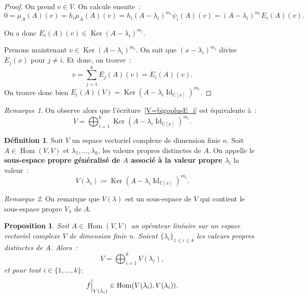 \documentclass{article}
\DeclareMathOperator{\Id}{Id}
\DeclareMathOperator{\Ker}{Ker}
\DeclareMathOperator{\Hom}{Hom}
\newcommand{\C}{\mathbb C}
\newcommand{\restr}[2]{ %
	\left.\kern-\nulldelimiterspace %
	#1 %
	\vphantom{\big|} %
	\right|_{#2} %
}
\newtheorem{prp}[thm]{Proposition}
\theoremstyle{definition}
\newtheorem{déf}[thm]{Définition}
\theoremstyle{remark}
\newtheorem*{rmq}{Remarque}
\begin{document}
		\begin{proof} On prend $v \in V$. On calcule ensuite~:
		\[0 = \mu_A(A)(v) = h_i\mu_A(A)(v) = h_i(A - \lambda_i)^{m_i}\psi_i(A)(v) = (A-\lambda_i)^{m_i}E_i(A)(v).\]

		On a donc $E_i(A)(v) \in \Ker(A - \lambda_i)^{m_i}$.

		Prenons maintenant $v \in \Ker(A - \lambda_i)^{m_i}$. On sait que $(x-\lambda_i)^{m_i}$ divise $E_j(x)$ pour $j \neq i$.
		Et donc, on trouve~: \[v = \sum_{j=1}^kE_j(A)(v) = E_i(A)(v).\]
		On trouve donc bien $E_i(A)(V) = \Ker(A-\lambda_i\Id_{\C[x]})^{m_i}$. \end{proof}

		\begin{rmq} On observe alors que l'écriture~\eqref{V=bigoplusE_i} est équivalente à~:
		\[V = \bigoplus_{i=1}^k\Ker(A - \lambda_i\Id_{\C[x]})^{m_i}.\]
		\end{rmq}

		\begin{déf} Soit $V$ un espace vectoriel complexe de dimension finie $n$. Soit $A \in \Hom(V, V)$ et $\lambda_1, \dotsc, \lambda_k$, les valeurs propres
		distinctes de $A$. On appelle le \textbf{sous-espace propre généralisé de $A$ associé à la valeur propre $\lambda_i$} la valeur~:
		\[V(\lambda_i) \coloneqq \Ker(A - \lambda_i \Id_{\C[x]})^{m_i}.\] \end{déf}

		\begin{rmq} On remarque que $V(\lambda)$ est un sous-espace de $V$ qui contient le sous-espace propre $V_\lambda$ de $A$. \end{rmq}

		\begin{prp} Soit $A \in \Hom(V, V)$ un opérateur linéaire sur un espace vectoriel complexe $V$ de dimension finie $n$. Soient $\{\lambda_i\}_{1 \leq i \leq k}$
		les valeurs propres distinctes de $A$. Alors~:
		\begin{equation}
			V = \bigoplus_{i=1}^kV(\lambda_i),
		\end{equation}
		et pour tout $i \in \{1, \dotsc, k\} :$
		\[\restr f{V(\lambda_i)} \in \Hom(V(\lambda_i), V(\lambda_i)).\]
		\end{prp}
		
\end{document}
